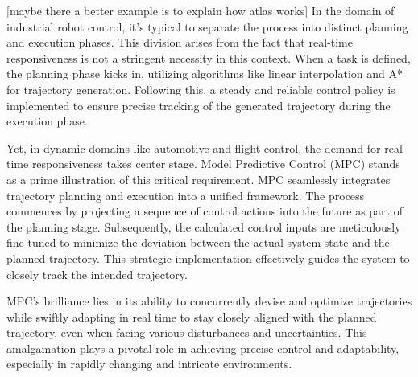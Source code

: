 [maybe there a better example is to explain how atlas works]
In the domain of industrial robot control, it's typical to separate the process into distinct planning and execution phases. This division arises from the fact that real-time responsiveness is not a stringent necessity in this context. When a task is defined, the planning phase kicks in, utilizing algorithms like linear interpolation and A* for trajectory generation. Following this, a steady and reliable control policy is implemented to ensure precise tracking of the generated trajectory during the execution phase.

Yet, in dynamic domains like automotive and flight control, the demand for real-time responsiveness takes center stage. Model Predictive Control (MPC) stands as a prime illustration of this critical requirement. MPC seamlessly integrates trajectory planning and execution into a unified framework. The process commences by projecting a sequence of control actions into the future as part of the planning stage. Subsequently, the calculated control inputs are meticulously fine-tuned to minimize the deviation between the actual system state and the planned trajectory. This strategic implementation effectively guides the system to closely track the intended trajectory.

MPC's brilliance lies in its ability to concurrently devise and optimize trajectories while swiftly adapting in real time to stay closely aligned with the planned trajectory, even when facing various disturbances and uncertainties. This amalgamation plays a pivotal role in achieving precise control and adaptability, especially in rapidly changing and intricate environments.

